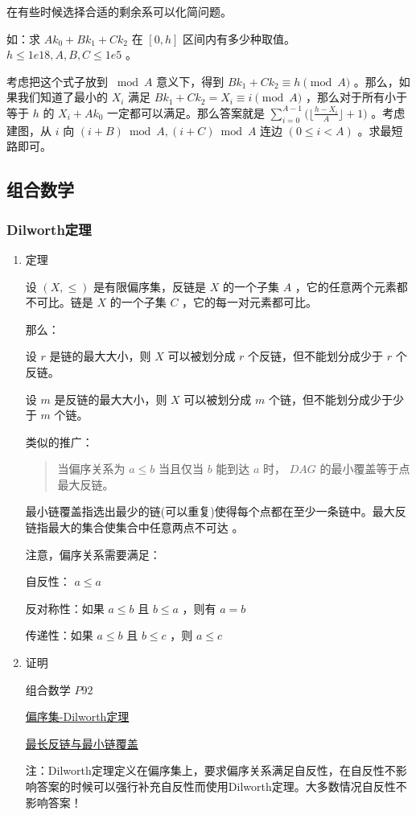 \documentclass[11pt]{article}
\begin{document}
在有些时候选择合适的剩余系可以化简问题。

如：求 $Ak_0+Bk_1+Ck_2$ 在 $[0,h]$ 区间内有多少种取值。 $h \leq 1e18,A, B, C \leq 1e5$ 。

考虑把这个式子放到 $\bmod A$ 意义下，得到 $Bk_1+Ck_2 \equiv h \pmod A$ 。那么，如果我们知道了最小的 $X_i$ 满足 $Bk_1+Ck_2=X_i \equiv i \pmod A$ ，那么对于所有小于等于 $h$ 的 $X_i+Ak_0$ 一定都可以满足。那么答案就是 $\sum_{i=0}^{A-1} \Big(\Big\lfloor \frac{h-X_i}{A} \Big \rfloor+1\Big)$ 。考虑建图，从 $i$ 向 $(i+B) \bmod A,(i+C) \bmod A$ 连边 $(0\leq i < A)$ 。求最短路即可。

\subsection{组合数学}
\label{sec-3-4}
\subsubsection{Dilworth定理}
\label{sec-3-4-1}

\begin{enumerate}
\item 定理
\label{sec-3-4-1-1}

设 $(X,\leq)$ 是有限偏序集，反链是 $X$ 的一个子集 $A$ ，它的任意两个元素都不可比。链是 $X$ 的一个子集 $C$ ，它的每一对元素都可比。

那么：

设 $r$ 是链的最大大小，则 $X$ 可以被划分成 $r$ 个反链，但不能划分成少于 $r$ 个反链。

设 $m$ 是反链的最大大小，则 $X$ 可以被划分成 $m$ 个链，但不能划分成少于少于 $m$ 个链。

类似的推广：

\begin{quote}
当偏序关系为 $a \leq b$ 当且仅当 $b$ 能到达 $a$ 时， $DAG$ 的最小覆盖等于点最大反链。
\end{quote}

最小链覆盖指选出最少的链(可以重复)使得每个点都在至少一条链中。最大反链指最大的集合使集合中任意两点不可达 。


注意，偏序关系需要满足：

自反性： $a \leq a$ 

反对称性：如果 $a \leq b$ 且 $b \leq a$ ，则有 $a = b$ 

传递性：如果 $a \leq b$ 且 $b \leq c$ ，则 $a \leq c$ 

\item 证明
\label{sec-3-4-1-2}

组合数学 $P92$

\href{http://blog.csdn.net/xuzengqiang/article/details/7266034}{偏序集-Dilworth定理}

\href{http://vfleaking.blog.163.com/blog/static/1748076342012918105514527}{最长反链与最小链覆盖}

注：Dilworth定理定义在偏序集上，要求偏序关系满足自反性，在自反性不影响答案的时候可以强行补充自反性而使用Dilworth定理。大多数情况自反性不影响答案！
\end{enumerate}
\end{document}
